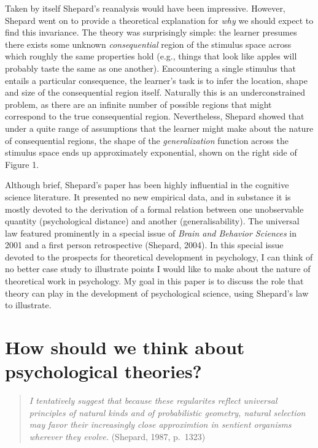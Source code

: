 \documentclass[english,doc]{apa6}
\begin{document}
Taken by itself Shepard's reanalysis would have been impressive. However, Shepard went on to provide a theoretical explanation for \emph{why} we should expect to find this invariance. The theory was surprisingly simple: the learner presumes there exists some unknown \emph{consequential} region of the stimulus space across which roughly the same properties hold (e.g., things that look like apples will probably taste the same as one another). Encountering a single stimulus that entails a particular consequence, the learner's task is to infer the location, shape and size of the consequential region itself. Naturally this is an underconstrained problem, as there are an infinite number of possible regions that might correspond to the true consequential region. Nevertheless, Shepard showed that under a quite range of assumptions that the learner might make about the nature of consequential regions, the shape of the \emph{generalization} function across the stimulus space ends up approximately exponential, shown on the right side of Figure 1.

Although brief, Shepard's paper has been highly influential in the cognitive science literature. It presented no new empirical data, and in substance it is mostly devoted to the derivation of a formal relation between one unobservable quantity (psychological distance) and another (generalisability). The universal law featured prominently in a special issue of \emph{Brain and Behavior Sciences} in 2001 and a first person retrospective (Shepard, 2004). In this special issue devoted to the prospects for theoretical development in psychology, I can think of no better case study to illustrate points I would like to make about the nature of theoretical work in psychology. My goal in this paper is to discuss the role that theory can play in the development of psychological science, using Shepard's law to illustrate.

\hypertarget{how-should-we-think-about-psychological-theories}{%
\section{How should we think about psychological theories?}\label{how-should-we-think-about-psychological-theories}}

\begin{quote}
\emph{I tentatively suggest that because these regularites reflect universal principles of natural kinds and of probabilistic geometry, natural selection may favor their increasingly close approximtion in sentient organisms wherever they evolve.} (Shepard, 1987, p.~1323)
\end{quote}
\end{document}

